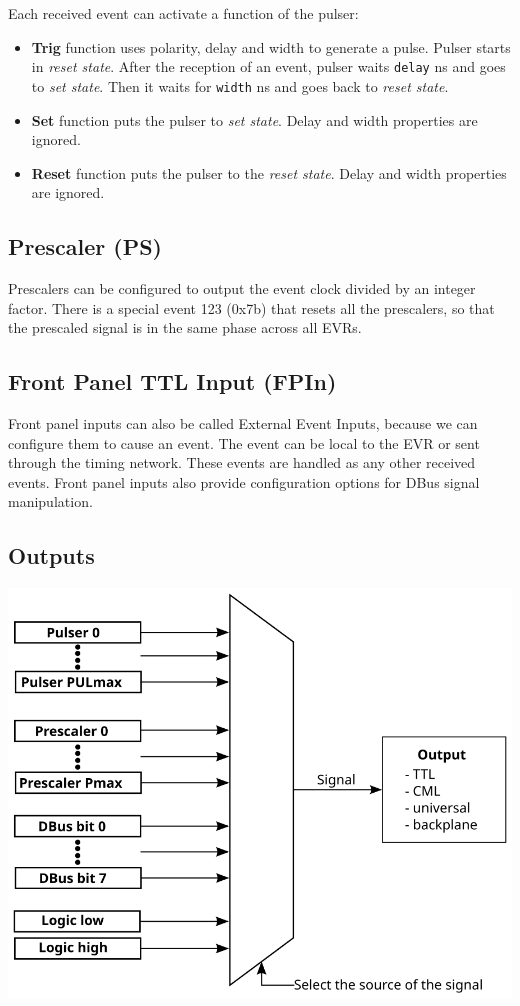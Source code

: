 \documentclass[12pt,a4paper]{article}
\begin{document}
Each received event can activate a function of the pulser:
\begin{itemize}
	\item \textbf{Trig} function uses polarity, delay and width to generate a pulse. Pulser starts in \textit{reset state}. After the reception of an event, pulser waits \texttt{delay} ns and goes to \textit{set state}. Then it waits for \texttt{width} ns and goes back to \textit{reset state}.
	\item \textbf{Set} function puts the pulser to \textit{set state}. Delay and width properties are ignored.
	\item \textbf{Reset} function puts the pulser to the \textit{reset state}. Delay and width properties are ignored.
\end{itemize}

\subsection{Prescaler (PS)}
Prescalers can be configured to output the event clock divided by an integer factor. There is a special event 123 (0x7b) that resets all the prescalers, so that the prescaled signal is in the same phase across all EVRs.

\subsection{Front Panel TTL Input (FPIn)}
Front panel inputs can also be called External Event Inputs, because we can configure them to cause an event. The event can be local to the EVR or sent through the timing network. These events are handled as any other received events. Front panel inputs also provide configuration options for DBus signal manipulation.

\subsection{Outputs}

	\includegraphics[]{./img/output}
\end{document}
